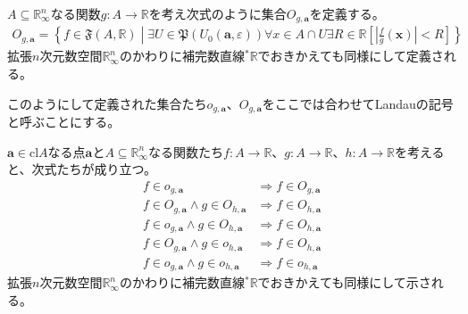 \documentclass[dvipdfmx]{jsarticle}
\begin{document}
\begin{dfn}
$A \subseteq \mathbb{R}_{\infty}^{n}$なる関数$g:A \rightarrow \mathbb{R}$を考え次式のように集合$O_{g,\mathbf{a}}$を定義する。
\begin{align*}
O_{g,\mathbf{a}} = \left\{ f \in \mathfrak{F}\left( A,\mathbb{R} \right) \middle| \exists U \in \mathfrak{P}\left( U_{0}\left( \mathbf{a},\varepsilon \right) \right)\forall x \in A \cap U\exists R \in \mathbb{R}\left[ \left| \frac{f}{g}\left( \mathbf{x} \right) \right| < R \right] \right\}
\end{align*}
拡張$n$次元数空間$\mathbb{R}_{\infty}^{n}$のかわりに補完数直線${}^{*}\mathbb{R}$でおきかえても同様にして定義される。
\end{dfn}
\begin{dfn} このようにして定義された集合たち$o_{g,\mathbf{a}}$、$O_{g,\mathbf{a}}$をここでは合わせてLandauの記号と呼ぶことにする。
\end{dfn}
\begin{thm}\label{4.2.4.1}
$\mathbf{a} \in \mathrm{cl}A$なる点$\mathbf{a}$と$A \subseteq \mathbb{R}_{\infty}^{n}$なる関数たち$f:A \rightarrow \mathbb{R}$、$g:A \rightarrow \mathbb{R}$、$h:A \rightarrow \mathbb{R}$を考えると、次式たちが成り立つ。
\begin{align*}
f \in o_{g,\mathbf{a}} &\Rightarrow f \in O_{g,\mathbf{a}}\\
f \in O_{g,\mathbf{a}} \land g \in O_{h,\mathbf{a}} &\Rightarrow f \in O_{h,\mathbf{a}}\\
f \in o_{g,\mathbf{a}} \land g \in O_{h,\mathbf{a}} &\Rightarrow f \in O_{h,\mathbf{a}}\\
f \in O_{g,\mathbf{a}} \land g \in o_{h,\mathbf{a}} &\Rightarrow f \in O_{h,\mathbf{a}}\\
f \in o_{g,\mathbf{a}} \land g \in o_{h,\mathbf{a}} &\Rightarrow f \in o_{h,\mathbf{a}}
\end{align*}
拡張$n$次元数空間$\mathbb{R}_{\infty}^{n}$のかわりに補完数直線${}^{*}\mathbb{R}$でおきかえても同様にして示される。
\end{thm}
\end{document}
